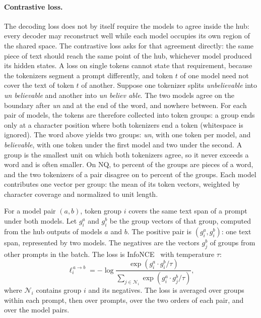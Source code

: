 \paragraph{Contrastive loss.} The decoding loss does not by itself require the models to agree inside the hub: every decoder may reconstruct well while each model occupies its own region of the shared space.
The contrastive loss asks for that agreement directly: the same piece of text should reach the same point of the hub, whichever model produced its hidden states.
A loss on single tokens cannot state that requirement, because the tokenizers segment a prompt differently, and token $t$ of one model need not cover the text of token $t$ of another.
Suppose one tokenizer splits \emph{unbelievable} into \emph{un \textbar{} believable} and another into \emph{un \textbar{} believ \textbar{} able}.
The two models agree on the boundary after \emph{un} and at the end of the word, and nowhere between.
For each pair of models, the tokens are therefore collected into token groups: a group ends only at a character position where both tokenizers end a token (whitespace is ignored).
The word above yields two groups: \emph{un}, with one token per model, and \emph{believable}, with one token under the first model and two under the second.
A group is the smallest unit on which both tokenizers agree, so it never exceeds a word and is often smaller.
On NQ,  to  percent of the groups are pieces of a word, and the two tokenizers of a pair disagree on  to  percent of the groups.
Each model contributes one vector per group: the mean of its token vectors, weighted by character coverage and normalized to unit length.

For a model pair $(a,b)$, token group $i$ covers the same text span of a prompt under both models.
Let $g^a_i$ and $g^b_i$ be the group vectors of that group, computed from the hub outputs of models $a$ and $b$.
The positive pair is $(g^a_i, g^b_i)$: one text span, represented by two models.
The negatives are the vectors $g^b_j$ of groups from other prompts in the batch.
The loss is InfoNCE~\cite{oord2018representation} with temperature $\tau$:
\begin{equation}
\ell^{\,a\to b}_i = -\log\frac{\exp(g^a_i\cdot g^b_i/\tau)}{\sum_{j\in\mathcal{N}_i}\exp(g^a_i\cdot g^b_j/\tau)} ,
\label{eq:hub:infonce}
\end{equation}
where $\mathcal{N}_i$ contains group $i$ and its negatives.
The loss is averaged over groups within each prompt, then over prompts, over the two orders of each pair, and over the model pairs.

